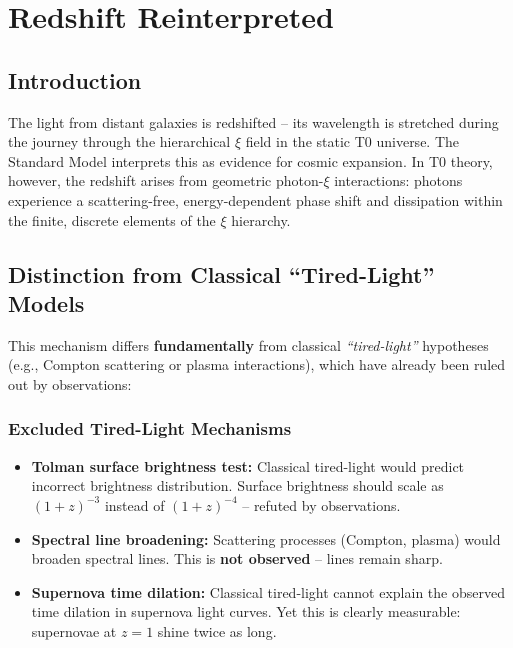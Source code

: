 
\chapter{Redshift Reinterpreted}


\section{Introduction}

The light from distant galaxies is redshifted -- its wavelength is stretched 
during the journey through the hierarchical $\xi$ field in the static T0 
universe. The Standard Model interprets this as evidence for cosmic expansion. 
In T0 theory, however, the redshift arises from geometric photon-$\xi$ 
interactions: photons experience a scattering-free, energy-dependent phase 
shift and dissipation within the finite, discrete elements of the $\xi$ 
hierarchy.

\section{Distinction from Classical ``Tired-Light'' Models}

This mechanism differs \textbf{fundamentally} from classical 
\emph{``tired-light''} hypotheses (e.g., Compton scattering or plasma 
interactions), which have already been ruled out by observations:

\subsection{Excluded Tired-Light Mechanisms}

\begin{itemize}
\item \textbf{Tolman surface brightness test:} 
      Classical tired-light would predict incorrect brightness distribution. 
      Surface brightness should scale as $(1+z)^{-3}$ instead of $(1+z)^{-4}$ 
      -- refuted by observations.

\item \textbf{Spectral line broadening:} 
      Scattering processes (Compton, plasma) would broaden spectral lines. 
      This is \textbf{not observed} -- lines remain sharp.

\item \textbf{Supernova time dilation:} 
      Classical tired-light cannot explain the observed time dilation in 
      supernova light curves. Yet this is clearly measurable: supernovae 
      at $z=1$ shine twice as long.
\end{itemize}

